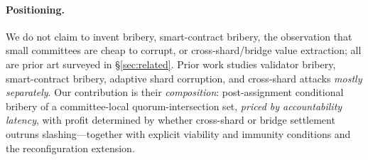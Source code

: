 \paragraph{Positioning.}
We do not claim to invent bribery, smart-contract bribery, the observation that small committees
are cheap to corrupt, or cross-shard/bridge value extraction; all are prior art surveyed in
\S\ref{sec:related}. Prior work studies validator bribery, smart-contract bribery, adaptive shard
corruption, and cross-shard attacks \emph{mostly separately}. Our contribution is their
\emph{composition}: post-assignment conditional bribery of a committee-local quorum-intersection
set, \emph{priced by accountability latency}, with profit determined by whether cross-shard or
bridge settlement outruns slashing---together with explicit viability and immunity conditions and
the reconfiguration extension.
